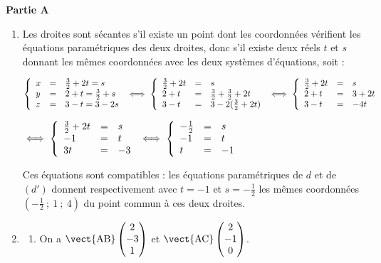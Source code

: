 \medskip

\begin{center}\textbf{Partie A} \end{center}

\smallskip

\begin{enumerate}
\item Les droites sont sécantes s'il existe un point dont les coordonnées vérifient les équations paramétriques des deux droites, donc s'il existe deux réels $t$ et $s$ donnant les mêmes coordonnées avec les deux systèmes d'équations, soit :

$\left\{\begin{array}{l c l}
x& =& \frac 32 + 2t = s\\
y&=&2 +t = \frac 32 + s\\
z&=&3 - t = 3 - 2s
\end{array}\right.\iff 
\left\{\begin{array}{l c l}
\frac 32 + 2t& =& s\\
2 +t &=& \frac 32 + \frac 32 + 2t\\
3 - t &=& 3 - 2(\frac 32 + 2t)
\end{array}\right. \iff \left\{\begin{array}{l c l}
\frac 32 + 2t& =& s\\
2 + t&=&3 + 2t\\
3 - t&=&- 4t\end{array}\right. $

$\iff \left\{\begin{array}{l c l} 
\frac 32 + 2t& =& s\\
- 1&=&t\\
3t&=&-3\end{array}\right. \iff \left\{\begin{array}{l c l} -\frac 12 & =& s\\
- 1&=&t\\
t&=&-1\end{array}\right.$

Ces équations sont compatibles : les équations paramétriques de $d$ et de $(d')$ donnent respectivement  avec $t = - 1$ et $s = -\frac 12$ les mêmes coordonnées $\left(- \frac12~;~1~;~4 \right)$ du point commun à ces deux droites.
\item
	\begin{enumerate}
		\item On a $\vect{\text{AB}}\begin{pmatrix}2\\-3\\1\end{pmatrix}$ et $\vect{\text{AC}}\begin{pmatrix}2\\-1\\0\end{pmatrix}$.


\end{enumerate}
\end{enumerate}
